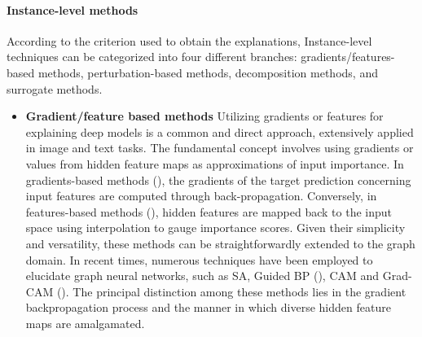 \documentclass[binding=0.6cm]{sapthesis}
\newcommand{\mycite}[1]{(\cite{#1})}
\begin{document}
\paragraph{Instance-level methods}
\label{sec:bg.xai.instance-level}
According to the criterion used to obtain the explanations, Instance-level techniques can be categorized into four different branches: gradients/features-based methods, perturbation-based methods, decomposition methods, and surrogate methods.  

\begin{itemize}
    \item \textbf{Gradient/feature based methods} Utilizing gradients or features for explaining deep models is a common and direct approach, extensively applied in image and text tasks. The fundamental concept involves using gradients or values from hidden feature maps as approximations of input importance. In gradients-based methods \mycite{simonyan2014-deep,smilkov2017-smoothgrad}, the gradients of the target prediction concerning input features are computed through back-propagation. Conversely, in features-based methods \mycite{zhou2015-learning,selvaraju2019-gradcam}, hidden features are mapped back to the input space using interpolation to gauge importance scores. Given their simplicity and versatility, these methods can be straightforwardly extended to the graph domain. In recent times, numerous techniques have been employed to elucidate graph neural networks, such as SA, Guided BP \mycite{baldassarre2019-explainability}, CAM and Grad-CAM \mycite{pope2019-CVPR}. The principal distinction among these methods lies in the gradient backpropagation process and the manner in which diverse hidden feature maps are amalgamated.
    

\end{itemize}
\end{document}
